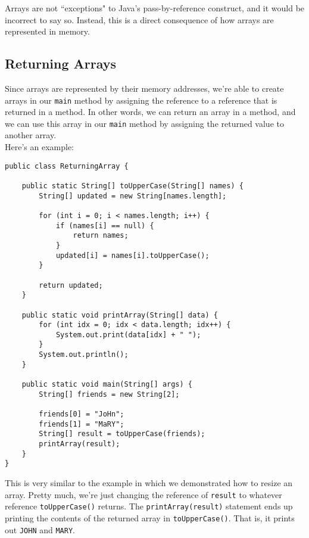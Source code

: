 Arrays are not ``exceptions" to Java's pass-by-reference construct, and it would be incorrect to say so. Instead, this is a direct consequence of how arrays are represented in memory.


\subsection{Returning Arrays}

Since arrays are represented by their memory addresses, we're able to create arrays in our \verb!main! method by assigning the reference to a reference that is returned in a method. In other words, we can return an array in a method, and we can use this array in our \verb!main! method by assigning the returned value to another array. \\

Here's an example:

\begin{lstlisting}
public class ReturningArray {

	public static String[] toUpperCase(String[] names) {
		String[] updated = new String[names.length];

		for (int i = 0; i < names.length; i++) {
			if (names[i] == null) {
				return names;
			}
			updated[i] = names[i].toUpperCase();
		}

		return updated;
	}

	public static void printArray(String[] data) {
		for (int idx = 0; idx < data.length; idx++) {
			System.out.print(data[idx] + " ");
		}
		System.out.println();
	}

	public static void main(String[] args) {
		String[] friends = new String[2];

		friends[0] = "JoHn";
		friends[1] = "MaRY";
		String[] result = toUpperCase(friends);
		printArray(result);
	}
}
\end{lstlisting}

This is very similar to the example in which we demonstrated how to resize an array. Pretty much, we're just changing the reference of \verb!result! to whatever reference \verb!toUpperCase()! returns. The \verb!printArray(result)! statement ends up printing the contents of the returned array in \verb!toUpperCase()!. That is, it prints out \verb!JOHN! and \verb!MARY!. 